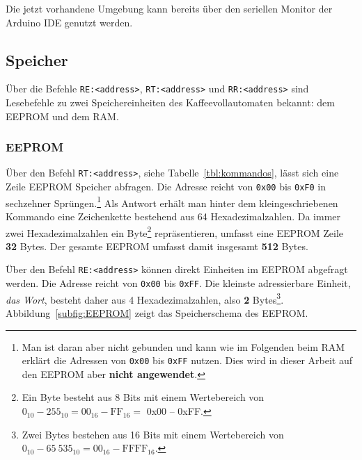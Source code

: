 Die jetzt vorhandene Umgebung kann bereits über den seriellen Monitor der Arduino \ac{IDE} genutzt werden.

\subsection{Speicher}\label{subsec:SpeicherDesKaffeevollautomaten}
Über die Befehle \texttt{RE:<address>}, \texttt{RT:<address>} und \texttt{RR:<address>} sind Lesebefehle zu zwei Speichereinheiten des Kaffeevollautomaten bekannt: dem \acf{EEPROM} und dem \acf{RAM}.

\subsubsection{EEPROM}\label{subsubsec:SpeicherDesKaffeevollautomatenEEPROM}
Über den Befehl \texttt{RT:<address>}, siehe Tabelle~\ref{tbl:kommandos}, lässt sich eine Zeile \ac{EEPROM} Speicher abfragen.
Die Adresse reicht von \texttt{0x00} bis \texttt{0xF0} in sechzehner Sprüngen.\footnote{Man ist daran aber nicht gebunden und kann wie im Folgenden beim \ac{RAM} erklärt die Adressen von \texttt{0x00} bis \texttt{0xFF} nutzen. Dies wird in dieser Arbeit auf den \ac{EEPROM} aber \textbf{nicht angewendet}.}
Als Antwort erhält man hinter dem kleingeschriebenen Kommando eine Zeichenkette bestehend aus 64 Hexadezimalzahlen.
Da immer zwei Hexadezimalzahlen ein Byte\footnote{Ein Byte besteht aus 8 Bits mit einem Wertebereich von $0_{10}-255_{10} = 00_{16}-\text{FF}_{16} = $ 0x00 -- 0xFF.} repräsentieren, umfasst eine \ac{EEPROM} Zeile \textbf{32} Bytes.
Der gesamte \ac{EEPROM} umfasst damit insgesamt \textbf{512} Bytes.

Über den Befehl \texttt{RE:<address>} können direkt Einheiten im \ac{EEPROM} abgefragt werden. Die Adresse reicht von \texttt{0x00} bis \texttt{0xFF}.
Die kleinste adressierbare Einheit, \textit{das Wort}, besteht daher aus 4 Hexadezimalzahlen, also \textbf{2} Bytes\footnote{Zwei Bytes bestehen aus 16 Bits mit einem Wertebereich von $0_{10}-65\:535_{10} = 00_{16}-\text{FFFF}_{16}$.}.\\
Abbildung~\ref{subfig:EEPROM} zeigt das Speicherschema des \ac{EEPROM}.

